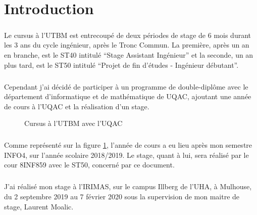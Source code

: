 \documentclass[a4paper,11pt,twoside,french,report]{../common/simplem}
\begin{document}
	\makeutbmfrontcover{}
	\tableofcontents{}
	\listoffigures{}
	\chapter*{Introduction}
		\paragraph*{}
			Le cursus à l'\gls{UTBM} est entrecoupé de deux périodes de stage de 6 mois durant les 3 ans du cycle ingénieur, après le Tronc Commun. La première, après un an en branche, est le ST40 intitulé ``Stage Assistant Ingénieur'' et la seconde, un an plus tard, est le ST50 intitulé ``Projet de fin d'études - Ingénieur débutant''.
		\paragraph*{}
			Cependant j'ai décidé de participer à un programme de double-diplôme avec le département d'informatique et de mathématique de \gls{UQAC}, ajoutant une année de cours à l'\gls{UQAC} et la réalisation d'un stage.
			\begin{figure}[H]
				\centering%
				\caption{Cursus à l'\acrshort{UTBM} avec l'\acrshort{UQAC}}%
				\label{fig:cursus_utbm_uqac}%
			\end{figure}
		\paragraph*{}
			Comme représenté sur la figure \ref{fig:cursus_utbm_uqac}, l'année de cours a eu lieu après mon semestre INFO4, sur l'année scolaire 2018/2019. Le stage, quant à lui, sera réalisé par le cour \gls{8INF859} avec le ST50, concerné par ce document.
		\paragraph*{}
			J'ai réalisé mon stage à l'\gls{IRIMAS}, sur le campus Illberg de l'\gls{UHA}, à Mulhouse, du 2 septembre 2019 au 7 février 2020 sous la supervision de mon maitre de stage, Laurent Moalic.
\end{document}
